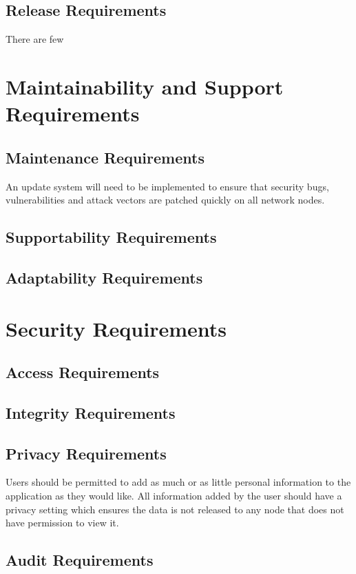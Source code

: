 \documentclass{article}
\begin{document}
\subsection{Release Requirements}
There are few 

\section{Maintainability and Support Requirements}

\subsection{Maintenance Requirements}
An update system will need to be implemented to ensure that security bugs, vulnerabilities and attack vectors are patched quickly on all network nodes. 

\subsection{Supportability Requirements}


\subsection{Adaptability Requirements}


\section{Security Requirements}

\subsection{Access Requirements}


\subsection{Integrity Requirements}


\subsection{Privacy Requirements}
Users should be permitted to add as much or as little personal information to the application as they would like. All information added by the user should have a privacy setting which ensures the data is not released to any node that does not have permission to view it.

\subsection{Audit Requirements}
\end{document}
